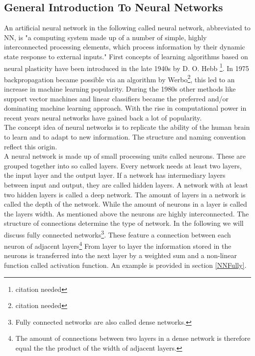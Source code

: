 		\subsection{General Introduction To Neural Networks}
		An artificial neural network in the following called neural network, abbreviated to NN, is "a computing system made up of a number of simple, highly interconnected processing elements, which process information by their dynamic state response to external inputs." \cite{NNPrimer} %
		First concepts of learning algorithms based on neural plasticity have been introduced in the late 1940s by D. O. Hebb \footnote{citation needed}. In 1975 backpropagation became possible via an algorithm by Werbo\footnote{citation needed}, this led to an increase in machine learning popularity. During the 1980s other methods like support vector machines and linear classifiers became the preferred and/or dominating machine learning approach. With the rise in computational power in recent years neural networks have gained back a lot of popularity.\\
		The concept idea of neural networks is to replicate the ability of the human brain to learn and to adapt to new information. The structure and naming convention reflect this origin.\\
		A neural network is made up of small processing units called neurons. These are grouped together into so called layers. Every network needs at least two layers, the input layer and the output layer. If a network has intermediary layers between input and output, they are called hidden layers. A network with at least two hidden layers is called a deep network. The amount of layers in a network is called the depth of the network. While the amount of neurons in a layer is called the layers width. As mentioned above the neurons are highly interconnected. The structure of connections determine the type of network. In the following we will discuss fully connected networks\footnote{Fully connected networks are also called dense networks.}. These feature a connection between each neuron of adjacent layers\footnote{The amount of connections between two layers in a dense network is therefore equal the the product of the width of adjacent layers.}
		From layer to layer the information stored in the neurons is transferred into the next layer by a weighted sum and a non-linear function called activation function. An example is provided in section \ref{NNFully}.\\
